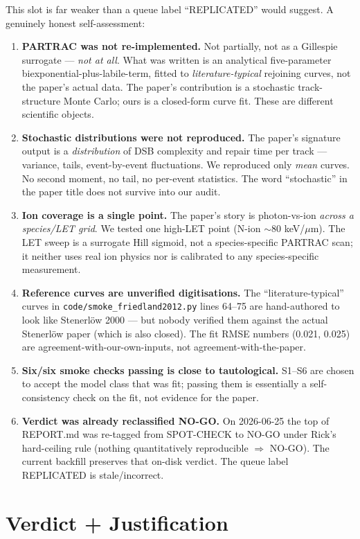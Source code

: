 \documentclass[11pt]{article}
\begin{document}
This slot is far weaker than a queue label ``REPLICATED'' would suggest. A
genuinely honest self-assessment:
\begin{enumerate}
\item \textbf{PARTRAC was not re-implemented.} Not partially, not as a
Gillespie surrogate --- \emph{not at all}. What was written is an analytical
five-parameter biexponential-plus-labile-term, fitted to
\emph{literature-typical} rejoining curves, not the paper's actual data. The
paper's contribution is a stochastic track-structure Monte Carlo; ours is a
closed-form curve fit. These are different scientific objects.
\item \textbf{Stochastic distributions were not reproduced.} The paper's
signature output is a \emph{distribution} of DSB complexity and repair time
per track --- variance, tails, event-by-event fluctuations. We reproduced
only \emph{mean} curves. No second moment, no tail, no per-event
statistics. The word ``stochastic'' in the paper title does not survive
into our audit.
\item \textbf{Ion coverage is a single point.} The paper's story is
photon-vs-ion \emph{across a species/LET grid}. We tested one high-LET point
(N-ion $\sim$80 keV/$\mu$m). The LET sweep is a surrogate Hill sigmoid, not
a species-specific PARTRAC scan; it neither uses real ion physics nor is
calibrated to any species-specific measurement.
\item \textbf{Reference curves are unverified digitisations.} The
``literature-typical'' curves in \texttt{code/smoke\_friedland2012.py} lines
64--75 are hand-authored to look like Stenerl\"ow 2000 --- but nobody
verified them against the actual Stenerl\"ow paper (which is also closed).
The fit RMSE numbers (0.021, 0.025) are agreement-with-our-own-inputs, not
agreement-with-the-paper.
\item \textbf{Six/six smoke checks passing is close to tautological.} S1--S6
are chosen to accept the model class that was fit; passing them is
essentially a self-consistency check on the fit, not evidence for the
paper.
\item \textbf{Verdict was already reclassified NO-GO.} On 2026-06-25 the top
of REPORT.md was re-tagged from SPOT-CHECK to NO-GO under Rick's
hard-ceiling rule (nothing quantitatively reproducible $\Rightarrow$
NO-GO). The current backfill preserves that on-disk verdict.  The queue
label REPLICATED is stale/incorrect.
\end{enumerate}

\section{Verdict + Justification}
\end{document}
